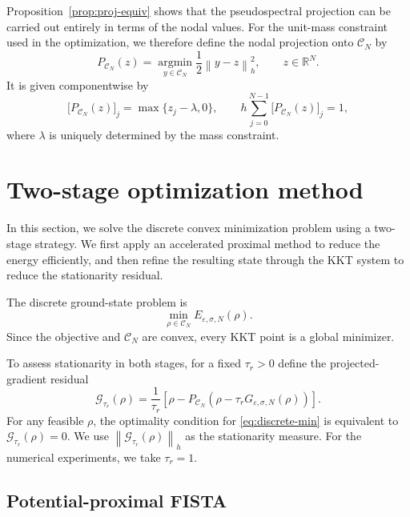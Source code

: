 \documentclass[11pt]{article}
\newcommand{\R}{\mathbb{R}}
\newcommand{\CN}{\mathcal{C}_N}
\newcommand{\eps}{\varepsilon}
\newcommand{\sig}{\sigma}
\newcommand{\norm}[1]{\left\|#1\right\|}
\theoremstyle{plain}
\theoremstyle{definition}
\numberwithin{equation}{section}
\begin{document}
Proposition~\ref{prop:proj-equiv} shows that the pseudospectral
projection can be carried out entirely in terms of the nodal values.
For the unit-mass constraint used in the optimization, we therefore
define the nodal projection onto $\CN$ by
\begin{equation}
\label{eq:nodal-projection}
P_{\CN}(z)
=
\operatorname*{argmin}_{y\in\CN}
\frac12\norm{y-z}_h^2,
\qquad z\in\R^N.
\end{equation}
It is given componentwise by
\begin{equation}
\label{eq:simplex-form}
\bigl[P_{\CN}(z)\bigr]_j
=
\max\{z_j-\lambda,0\},
\qquad
h\sum_{j=0}^{N-1}
\bigl[P_{\CN}(z)\bigr]_j
=
1,
\end{equation}
where $\lambda$ is uniquely determined by the mass constraint.

\section{Two-stage optimization method}
\label{sec:opt}

In this section, we solve the discrete convex minimization problem
using a two-stage strategy. We first apply an accelerated proximal
method to reduce the energy efficiently, and then refine the resulting
state through the KKT system to reduce the stationarity residual.

The discrete ground-state problem is
\begin{equation}
\label{eq:discrete-min}
\min_{\rho\in\CN}E_{\eps,\sig,N}(\rho).
\end{equation}
Since the objective and $\CN$ are convex, every KKT point is a global
minimizer.

To assess stationarity in both stages, for a fixed $\tau_r>0$ define
the projected-gradient residual
\begin{equation}
\label{eq:pg-map}
\mathcal G_{\tau_r}(\rho)
=
\frac{1}{\tau_r}
\left[
\rho
-
P_{\CN}
\left(
\rho-\tau_rG_{\eps,\sig,N}(\rho)
\right)
\right].
\end{equation}
For any feasible $\rho$, the optimality condition for
\eqref{eq:discrete-min} is equivalent to
$\mathcal G_{\tau_r}(\rho)=0$. We use
$\norm{\mathcal G_{\tau_r}(\rho)}_h$ as the stationarity measure.
For the numerical experiments, we take $\tau_r=1$.


\subsection{Potential-proximal FISTA}
\label{subsec:potential_FISTA}
\end{document}
